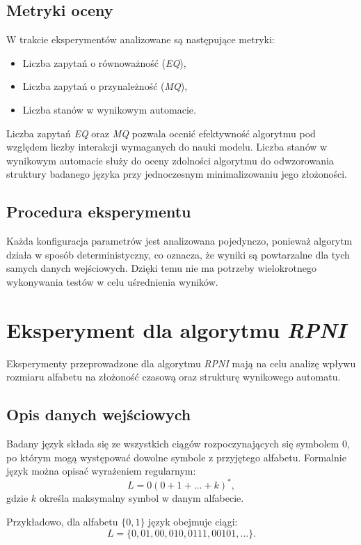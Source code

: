 \subsection{Metryki oceny}  
W trakcie eksperymentów analizowane są następujące metryki:  
\begin{itemize}  
    \item Liczba zapytań o równoważność (\textit{EQ}),  
    \item Liczba zapytań o przynależność (\textit{MQ}),  
    \item Liczba stanów w wynikowym automacie.
\end{itemize}  

Liczba zapytań \textit{EQ} oraz \textit{MQ} pozwala ocenić efektywność algorytmu pod względem liczby interakcji wymaganych do nauki modelu. Liczba stanów w wynikowym automacie służy do oceny zdolności algorytmu do odwzorowania struktury badanego języka przy jednoczesnym minimalizowaniu jego złożoności.  

\subsection{Procedura eksperymentu}  
Każda konfiguracja parametrów jest analizowana pojedynczo, ponieważ algorytm działa w sposób deterministyczny, co oznacza, że wyniki są powtarzalne dla tych samych danych wejściowych. Dzięki temu nie ma potrzeby wielokrotnego wykonywania testów w celu uśrednienia wyników.  


\section{Eksperyment dla algorytmu \textit{RPNI}}  
Eksperymenty przeprowadzone dla algorytmu \textit{RPNI} mają na celu analizę wpływu rozmiaru alfabetu na złożoność czasową oraz strukturę wynikowego automatu.  

\subsection{Opis danych wejściowych}  
Badany język składa się ze wszystkich ciągów rozpoczynających się symbolem \( 0 \), po którym mogą występować dowolne symbole z przyjętego alfabetu. Formalnie język można opisać wyrażeniem regularnym:  
\[
L = 0(0 + 1 + \ldots + k)^*,
\]  
gdzie \( k \) określa maksymalny symbol w danym alfabecie.  

Przykładowo, dla alfabetu \(\{0, 1\}\) język obejmuje ciągi:  
\[
L = \{0, 01, 00, 010, 0111, 00101, \ldots \}.
\]  

